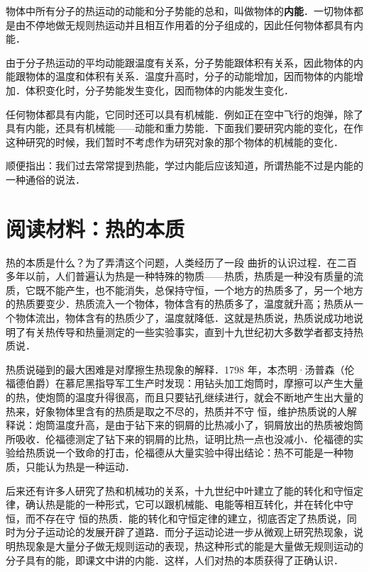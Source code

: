 物体中所有分子的热运动的动能和分子势能的总和，叫做物体的\textbf{内能}．一切物体都是由不停地做无规则热运动并且相互作用着的分子组成的，因此任何物体都具有内能．

由于分子热运动的平均动能跟温度有关系，分子势能跟体积有关系，因此物体的内能跟物体的温度和体积有关系．温度升高时，分子的动能增加，因而物体的内能增加．体积变化时，分子势能发生变化，因而物体的内能发生变化．

任何物体都具有内能，它同时还可以具有机械能．例如正在空中飞行的炮弹，除了具有内能，还具有机械能——动能和重力势能．下面我们要研究内能的变化，在作这种研究的时候，我们暂时不考虑作为研究对象的那个物体的机械能的变化．

顺便指出：我们过去常常提到热能，学过内能后应该知道，所谓热能不过是内能的一种通俗的说法．

\section*{阅读材料：热的本质}
热的本质是什么？为了弄清这个问题，人类经历了一段
曲折的认识过程．在二百多年以前，人们普遍认为热是一种特殊的物质——热质，热质是一种没有质量的流质，它既不能产生，也不能消失，总保持守恒，一个地方的热质多了，另一个地方的热质要变少．热质流入一个物体，物体含有的热质多了，温度就升高；热质从一个物体流出，物体含有的热质少了，温度就降低．这就是热质说，热质说成功地说明了有关热传导和热量测定的一些实验事实，直到十九世纪初大多数学者都支持热质说．

热质说碰到的最大困难是对摩擦生热现象的解释．1798
年，本杰明·汤普森（伦福德伯爵）在慕尼黑指导军工生产时发现：用钻头加工炮筒时，摩擦可以产生大量的热，使炮筒的温度升得很高，而且只要钻孔继续进行，就会不断地产生出大量的热来，好象物体里含有的热质是取之不尽的，热质并不守
恒，维护热质说的人解释说：炮筒温度升高，是由于钻下来的铜屑的比热减小了，铜屑放出的热质被炮筒所吸收．伦福德测定了钻下来的铜屑的比热，证明比热一点也没减小．伦福德的实验给热质说一个致命的打击，伦福德从大量实验中得出结论：热不可能是一种物质，只能认为热是一种运动．

后来还有许多人研究了热和机械功的关系，十九世纪中叶建立了能的转化和守恒定律，确认热是能的一种形式，它可以跟机械能、电能等相互转化，并在转化中守恒，而不存在守
恒的热质．能的转化和守恒定律的建立，彻底否定了热质说，同时为分子运动论的发展开辟了道路．而分子运动论进一步从微观上研究热现象，说明热现象是大量分子做无规则运动的表现，热这种形式的能是大量做无规则运动的分子具有的能，即课文中讲的内能．这样，人们对热的本质获得了正确认识．


